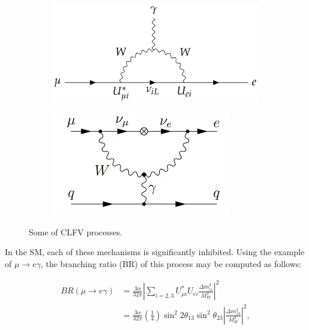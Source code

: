 \begin{figure}[!h]
     \begin{subfigure}[b]{0.4\linewidth}
         \centering
         \includegraphics[scale = 0.2]{figures/png/Screenshot_20240217_171058.png}
         \label{fig:mutoegamma}
     \end{subfigure}
     \begin{subfigure}[b]{0.7\linewidth}
         \centering
         \includegraphics[scale = 0.5]{figures/jpg/1_erkKoywyuFzJmMv4PKpc9Q.jpg}
         \label{fig:mutoeN}
     \end{subfigure}
     \caption{Some of CLFV processes.}
        \label{fig:three graphs2}
\end{figure}
In the SM, each of these mechanisms is significantly inhibited. Using the example of $\mu \rightarrow  e \gamma $, the branching ratio (BR) of this process may be computed as follows:

\begin{equation}\label{br}
\begin{aligned}
B R(\mu \rightarrow e \gamma) & =\frac{3 \alpha}{32 \pi}\left|\sum_{i=2,3} U_{\mu i}^* U_{e i} \frac{\Delta m_{1 i}^2}{M_W^2}\right|^2 \\
& =\frac{3 \alpha}{32 \pi}\left(\frac{1}{4}\right) \sin ^2 2 \theta_{13} \sin ^2 \theta_{23}\left|\frac{\Delta m_{13}^2}{M_W^2}\right|^2,
\end{aligned}
\end{equation}

